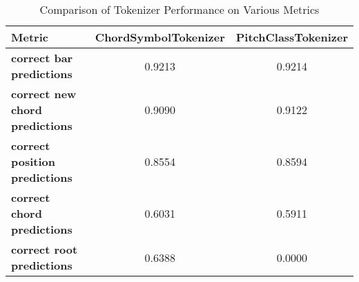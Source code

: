 
    \begin{table}[h]
        \centering
        \renewcommand{\arraystretch}{1.2}
        \begin{tabular}{lcc}
            \hline
            \textbf{Metric} & \textbf{ChordSymbolTokenizer} & \textbf{PitchClassTokenizer} \\
            \hline
            \textbf{correct bar predictions} & 0.9213 & 0.9214 \\
        \textbf{correct new chord predictions} & 0.9090 & 0.9122 \\
        \textbf{correct position predictions} & 0.8554 & 0.8594 \\
        \textbf{correct chord predictions} & 0.6031 & 0.5911 \\
        \textbf{correct root predictions} & 0.6388 & 0.0000 \\
        \hline
        \end{tabular}
        \caption{Comparison of Tokenizer Performance on Various Metrics}
        \label{tab:tokenizer_performance}
    \end{table}
    